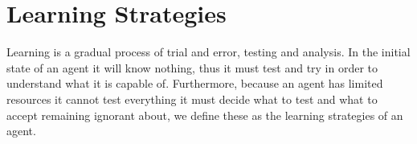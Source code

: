 \documentclass[Master.tex]{subfiles}
\begin{document}
	\begin{comment}

	    \section*{Sec1}

	    Learning has two important steps to it, the first is figuring out
	    what to do in order to learn about something and the second is analysis
	    of what occured to understand and actually learn about it.


	    Analysing an outcome is about figuring out what occured and what did
	    not occur. For instance if one pressed

	    In a STRIPS domain, all actions are absolute thus we know that if
	    an action changed the state then the action's preconditions was satisfied
	    and all predicates added
    \end{comment}



    \section*{Learning Strategies} \label{sec:strats}

    Learning is a gradual process of trial and error, testing and analysis.
    In the initial state of an agent it will know nothing, thus it must
    test and try in order to understand what it is capable of. Furthermore, because an agent has limited resources it cannot test everything it must decide what to test and what to accept remaining ignorant about, we define these as the learning strategies of an agent.
\end{document}
